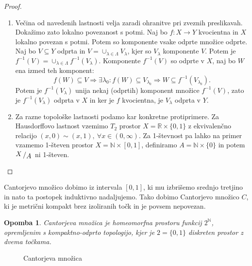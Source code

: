 \documentclass[10pt, a4paper]{article}
\newtheorem*{opomba}{Opomba}
\newenvironment{noticeC}{%
  \tcolorbox[%
  notitle,
  empty,
  enhanced,  %
  breakable,
  coltext=black, 
  fontupper=\rmfamily,
  noparskip,
  sharp corners,
  boxrule=-1pt,  %
  frame hidden,
  left=7pt,  %
  right=7pt,
  top=5pt,
  bottom=5pt,
  before skip=2.5ex plus 2pt,
  after skip=2.5ex plus 2pt,
  overlay unbroken and last={%
  },
  ]}
{\endtcolorbox}
\newenvironment{dokaz}%
  {\begin{noticeC}\begin{proof}}%
  {\end{proof}\end{noticeC}}
\newcommand{\N}{\mathbb {N}}
\newcommand{\R}{\mathbb {R}}
\newcommand{\quot}[2]{{\raisebox{0.1em}{$#1$}\left/\raisebox{-0.2em}{$#2$}\right.}}
\begin{document}
\begin{dokaz}
  \begin{enumerate}
    \item Večina od navedenih lastnosti velja zaradi ohranitve pri zveznih preslikavah.
    Dokažimo zato lokalno povezanost s potmi.
    Naj bo $f: X \to Y$ kvocientna in $X$ lokalno povezan s potmi.
    Potem so komponente vsake odprte množice odprte.
    Naj bo $V \subseteq Y$ odprta in $V = \cup_{\lambda \in \Lambda} V_\lambda$,
    kjer so $V_\lambda$ komponente $V$. Potem je $f^{-1} (V) = \cup_{\lambda \in \Lambda} f^{-1} (V_\lambda)$.
    Komponente $f^{-1} (V)$ so odprte v $X$, naj bo $W$ ena izmed teh komponent:
    $$f(W) \subseteq V \Rightarrow \exists \lambda_0 : f(W) \subseteq V_{\lambda_0} \Rightarrow W \subseteq f^{-1}(V_{\lambda_0}).$$
    Potem je $f^{-1} (V_\lambda)$ unija nekaj (odprtih) komponent množice $f^{-1} (V)$, zato je 
    $f^{-1} (V_\lambda)$ odprta v $X$ in ker je $f$ kvocientna, je $V_\lambda$ odprta v $Y$.
    
    \item Za razne topološke lastnosti podamo kar konkretne protiprimere.
    Za Hausdorffovo lastnost vzemimo $T_2$ prostor $X = \R \times \{0, 1\}$ z ekvivalenčno 
    relacijo $(x, 0) \sim (x, 1),\ \forall x \in (0, \infty)$.
    Za 1-števnost pa lahko na primer vzamemo 1-števen prostor $X = \N \times [0, 1]$, 
    definiramo $A = \N \times \{0\}$ in potem $\quot{X}{A}$ ni 1-števen. \qedhere
  \end{enumerate}
\end{dokaz}

Cantorjevo množico dobimo iz intervala $[0, 1]$, ki mu izbrišemo srednjo tretjino in nato ta postopek 
induktivno nadaljujemo. Tako dobimo Cantorjevo množico $C$, ki je metrični kompakt brez izoliranih točk 
in je povsem nepovezan.

\begin{opomba}
  Cantorjeva množica je homeomorfna prostoru funkcij $2^{\N}$,
  opremljenim s kompaktno-odprto topologijo, kjer je $2 = \{0, 1\}$
  diskreten prostor z dvema točkama.
\end{opomba}

\begin{figure}[htb!]
  \centering 
  \caption{Cantorjeva množica}
\end{figure}
\end{document}
